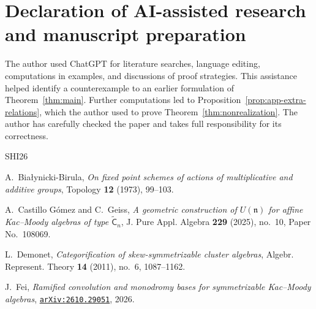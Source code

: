 \documentclass[12pt,reqno]{amsart}
\newcommand{\arxiv}[1]{\href{http://arxiv.org/abs/#1}{\tt arXiv:\nolinkurl{#1}}}
\numberwithin{equation}{section}
\theoremstyle{definition}
\theoremstyle{remark}
\theoremstyle{plain}
\theoremstyle{plain}
\begin{document}
\section*{Declaration of AI-assisted research and manuscript preparation}
The author used ChatGPT for literature searches, language editing, computations in examples, and discussions of proof strategies. This assistance helped identify a counterexample to an earlier formulation of Theorem~\ref{thm:main}. Further computations led to Proposition~\ref{prop:app-extra-relations}, which the author used to prove Theorem~\ref{thm:nonrealization}. The author has carefully checked the paper and takes full responsibility for its correctness. 
\begin{thebibliography}{SHI26}

     A.~Bia{\l}ynicki-Birula, \emph{On fixed point schemes of actions of multiplicative and additive groups}, Topology \textbf{12} (1973), 99--103.

     A.~Castillo G\'omez and C.~Geiss, \emph{A geometric construction of $U(\mathfrak n)$ for affine Kac--Moody algebras of type $\widetilde{\mathsf C}_n$}, J. Pure Appl. Algebra \textbf{229} (2025), no.~10, Paper No.~108069.

     L.~Demonet, \emph{Categorification of skew-symmetrizable cluster algebras}, Algebr. Represent. Theory \textbf{14} (2011), no.~6, 1087--1162.

     J.~Fei, \emph{Ramified convolution and monodromy bases for symmetrizable Kac--Moody algebras}, \arxiv{2610.29051}, 2026.






\end{thebibliography}
\end{document}
